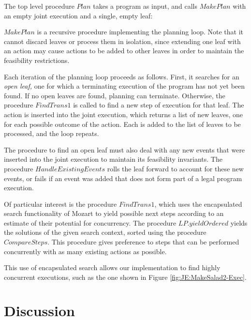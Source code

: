 The top level procedure $Plan$ takes a program as input, and calls
$MakePlan$ with an empty joint execution and a single, empty leaf:


$MakePlan$ is a recursive procedure implementing the planning loop.
Note that it cannot discard leaves or process them in isolation, since
extending one leaf with an action may cause actions to be added to
other leaves in order to maintain the feasibility restrictions.


Each iteration of the planning loop proceeds as follows. First, it
searches for an \emph{open leaf,} one for which a terminating execution
of the program has not yet been found. If no open leaves are found,
planning can terminate. Otherwise, the procedure $FindTrans1$ is
called to find a new step of execution for that leaf. The action is
inserted into the joint execution, which returns a list of new leaves,
one for each possible outcome of the action. Each is added to the
list of leaves to be processed, and the loop repeats.

The procedure to find an open leaf must also deal with any new events
that were inserted into the joint execution to maintain its feasibility
invariants. The procedure $HandleExistingEvents$ rolls the leaf forward
to account for these new events, or fails if an event was added that
does not form part of a legal program execution.


Of particular interest is the procedure $FindTrans1$, which uses
the encapsulated search functionality of Mozart to yield possible
next steps according to an estimate of their potential for concurrency.
The procedure $LP.yieldOrdered$ yields the solutions of the given
search context, sorted using the procedure $CompareSteps$. This procedure
gives preference to steps that can be performed concurrently with
as many existing actions as possible.


This use of encapsulated search allows our implementation to find
highly concurrent executions, such as the one shown in Figure \ref{fig:JE:MakeSalad2-Exec}.


\section{Discussion\label{sec:JointExec:Discussion}}

